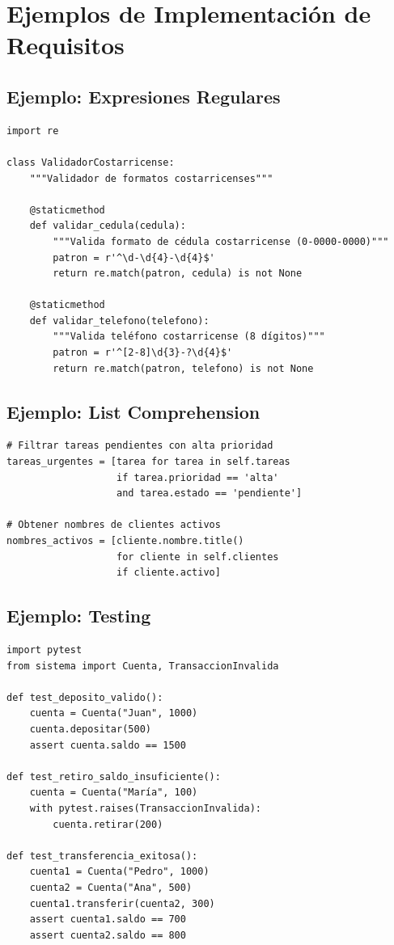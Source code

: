 \documentclass[12pt,a4paper]{article}
\begin{document}
\section{Ejemplos de Implementación de Requisitos}

\subsection{Ejemplo: Expresiones Regulares}

\begin{verbatim}
import re

class ValidadorCostarricense:
    """Validador de formatos costarricenses"""
    
    @staticmethod
    def validar_cedula(cedula):
        """Valida formato de cédula costarricense (0-0000-0000)"""
        patron = r'^\d-\d{4}-\d{4}$'
        return re.match(patron, cedula) is not None
    
    @staticmethod
    def validar_telefono(telefono):
        """Valida teléfono costarricense (8 dígitos)"""
        patron = r'^[2-8]\d{3}-?\d{4}$'
        return re.match(patron, telefono) is not None
\end{verbatim}

\subsection{Ejemplo: List Comprehension}

\begin{verbatim}
# Filtrar tareas pendientes con alta prioridad
tareas_urgentes = [tarea for tarea in self.tareas 
                   if tarea.prioridad == 'alta' 
                   and tarea.estado == 'pendiente']

# Obtener nombres de clientes activos
nombres_activos = [cliente.nombre.title() 
                   for cliente in self.clientes 
                   if cliente.activo]
\end{verbatim}

\subsection{Ejemplo: Testing}

\begin{verbatim}
import pytest
from sistema import Cuenta, TransaccionInvalida

def test_deposito_valido():
    cuenta = Cuenta("Juan", 1000)
    cuenta.depositar(500)
    assert cuenta.saldo == 1500

def test_retiro_saldo_insuficiente():
    cuenta = Cuenta("María", 100)
    with pytest.raises(TransaccionInvalida):
        cuenta.retirar(200)

def test_transferencia_exitosa():
    cuenta1 = Cuenta("Pedro", 1000)
    cuenta2 = Cuenta("Ana", 500)
    cuenta1.transferir(cuenta2, 300)
    assert cuenta1.saldo == 700
    assert cuenta2.saldo == 800
\end{verbatim}
\end{document}
